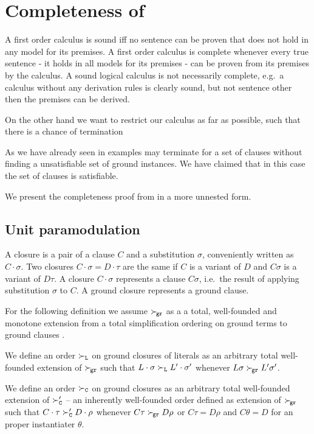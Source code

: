 
\chapter{Completeness of \InstGenEQ}

A first order calculus is sound
iff no sentence can be proven that does not hold
in any model for its premises.
A first order calculus is complete whenever every true sentence
- it holds in all models for its premises - can be proven from its premises by the calculus.
A sound logical calculus is not necessarily complete,
e.g.~a calculus without any derivation rules is clearly sound,
but not sentence other then the premises can be derived.

On the other hand we want to restrict our calculus as far as possible,
such that there is a chance of termination

As we have already seen in examples \InstGenEQ
may terminate for a set of clauses without finding
a unsatisfiable set of ground instances.
We have claimed that in this case the set of clauses is satisfiable.



We present the completeness proof from \cite{GK2004csl} in a more unnested form.


\section{Unit paramodulation}\label{sec:unit:paramodulation}

\begin{definition}
    A closure is a pair of a clause $C$ and a substitution $\sigma$,
    conveniently written as $C\cdot\sigma$. Two closures $C\cdot\sigma = D\cdot\tau$
    are the same if $C$ is a variant of $D$ and $C\sigma$ is a variant of $D\tau$.
    A closure $C\cdot\sigma$ represents a clause $C\sigma$,
    i.e.~the result of applying substitution $\sigma$ to $C$.
    A ground closure represents a ground clause.
\end{definition}

For the following definition we assume
$\mathrel\succ_{\!\mathtt{gr}}$ as a a total, well-founded and monotone extension
from a total simplification ordering on ground terms
to ground clauses \cite{NR2001}.

\begin{definition}
    We define an order $\mathrel\succ_{\mathtt{L}}$ on ground closures of literals
    as an arbitrary total well-founded extension of $\mathrel\succ_{\!\mathtt{gr}}$
    such that
    $L\cdot\sigma\mathrel\succ_{\mathtt{L}} L'\cdot\sigma'$ whenever
    $L\sigma\mathrel\succ_{\!\mathtt{gr}} L'\sigma'$.

    We define an order \( \mathrel\succ_{\mathtt{C}} \) on ground closures
    as an arbitrary total well-founded extension of
    $\mathrel\succ_{\mathtt{C}}'$ -- an inherently well-founded order defined as extension of $\mathrel\succ_{\!\mathtt{gr}}$
    such that
    $C\cdot\tau\mathrel\succ_{\mathtt{C}}' D\cdot\rho$ whenever
    $C\tau\mathrel\succ_{\!\mathtt{gr}} D\rho$ or $C\tau = D\rho$ and $C\theta = D$ for an proper instantiater $\theta$.
\end{definition}

